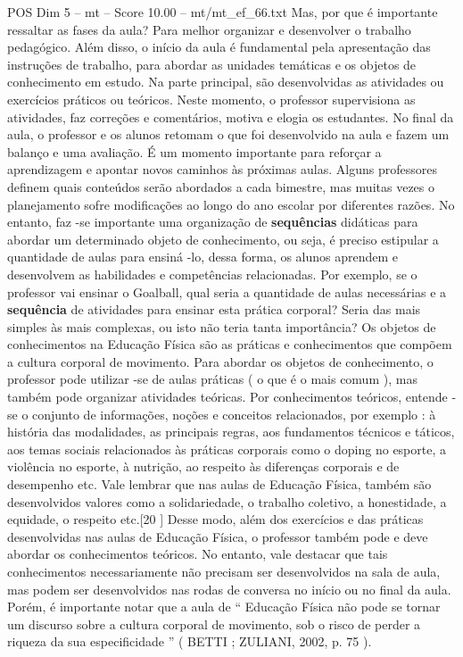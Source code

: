 \begin{textsample}{POS Dim 5 – mt – Score 10.00 – mt/mt\_ef\_66.txt}
Mas, por que é importante ressaltar as fases da aula?
Para melhor organizar e desenvolver o trabalho pedagógico.
Além disso, o início da aula é fundamental pela apresentação das instruções de trabalho, para abordar as unidades temáticas e os objetos de conhecimento em estudo.
Na parte principal, são desenvolvidas as atividades ou exercícios práticos ou teóricos.
Neste momento, o professor supervisiona as atividades, faz correções e comentários, motiva e elogia os estudantes.
No final da aula, o professor e os alunos retomam o que foi desenvolvido na aula e fazem um balanço e uma avaliação.
É um momento importante para reforçar a aprendizagem e apontar novos caminhos às próximas aulas.
Alguns professores definem quais conteúdos serão abordados a cada bimestre, mas muitas vezes o planejamento sofre modificações ao longo do ano escolar por diferentes razões.
No entanto, faz -se importante uma organização de \textbf{sequências} didáticas para abordar um determinado objeto de conhecimento, ou seja, é preciso estipular a quantidade de aulas para ensiná -lo, dessa forma, os alunos aprendem e desenvolvem as habilidades e competências relacionadas.
Por exemplo, se o professor vai ensinar o Goalball, qual seria a quantidade de aulas necessárias e a \textbf{sequência} de atividades para ensinar esta prática corporal?
Seria das mais simples às mais complexas, ou isto não teria tanta importância?
Os objetos de conhecimentos na Educação Física são as práticas e conhecimentos que compõem a cultura corporal de movimento.
Para abordar os objetos de conhecimento, o professor pode utilizar -se de aulas práticas ( o que é o mais comum ), mas também pode organizar atividades teóricas.
Por conhecimentos teóricos, entende -se o conjunto de informações, noções e conceitos relacionados, por exemplo : à história das modalidades, as principais regras, aos fundamentos técnicos e táticos, aos temas sociais relacionados às práticas corporais como o doping no esporte, a violência no esporte, à nutrição, ao respeito às diferenças corporais e de desempenho etc.
Vale lembrar que nas aulas de Educação Física, também são desenvolvidos valores como a solidariedade, o trabalho coletivo, a honestidade, a equidade, o respeito etc.[20 ] Desse modo, além dos exercícios e das práticas desenvolvidas nas aulas de Educação Física, o professor também pode e deve abordar os conhecimentos teóricos.
No entanto, vale destacar que tais conhecimentos necessariamente não precisam ser desenvolvidos na sala de aula, mas podem ser desenvolvidos nas rodas de conversa no início ou no final da aula.
Porém, é importante notar que a aula de “ Educação Física não pode se tornar um discurso sobre a cultura corporal de movimento, sob o risco de perder a riqueza da sua especificidade ” ( BETTI ; ZULIANI, 2002, p. 75 ).

\end{textsample}
